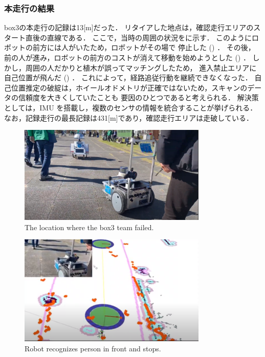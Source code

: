 \documentclass[twocolumn, 9pt]{jsproceedings}
\begin{document}
\subsubsection{本走行の結果}
box3の本走行の記録は13[m]だった．
リタイアした地点は，確認走行エリアのスタート直後の直線である．
ここで，当時の周囲の状況をに示す．
このようにロボットの前方には人がいたため，ロボットがその場で
停止した () ．
その後，前の人が進み，ロボットの前方のコストが消えて移動を始めようとした () ． 
しかし，周囲の人だかりと植木が誤ってマッチングしたため，
進入禁止エリアに自己位置が飛んだ () ．
これによって，経路追従行動を継続できなくなった．
自己位置推定の破綻は，ホイールオドメトリが正確ではないため，スキャンのデータの信頼度を大きくしていたことも
要因のひとつであると考えられる．
解決策としては，IMU を搭載し，複数のセンサの情報を統合することが挙げられる．
なお，記録走行の最長記録は431[m]であり，確認走行エリアは走破している．

\begin{figure}[H]
  \centering
  \includegraphics[width=90mm]{fig/human.pdf}
  \caption{The location where the box3 team failed.}
  \label{fig:box3-human}
\end{figure}

\begin{figure}[H]
  \centering
  \includegraphics[width=90mm]{fig/box3_1.pdf}
  \caption{Robot recognizes person in front and stops.}
  \label{fig:box3-result-1}
\end{figure}
\end{document}
